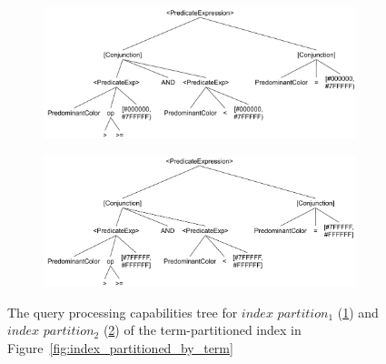 \begin{figure}
  \begin{subfigure}{0.5\textwidth}
     \includegraphics[width=\linewidth]{./figures/case_studies/qpt_index_partitioning_terms_1.pdf}%
     \caption{}
     \label{fig:qpt_index_partitioning_terms_1}
  \end{subfigure}%
  \hspace*{\fill}
  \begin{subfigure}{0.5\textwidth}
    \includegraphics[width=\linewidth]{./figures/case_studies/qpt_index_partitioning_terms_2.pdf}%
    \caption{}
    \label{fig:qpt_index_partitioning_terms_2}
  \end{subfigure}%
\caption{The query processing capabilities tree for $index$ $partition_1$ (\ref{fig:qpt_index_partitioning_terms_1}) and $index$ $partition_2$ (\ref{fig:qpt_index_partitioning_terms_2}) of the term-partitioned
index in Figure~\ref{fig:index_partitioned_by_term}}
\label{fig:qpt_index_partitioning_terms}
\end{figure}



